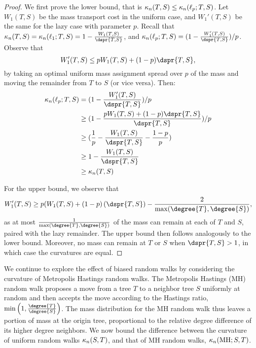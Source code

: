 \documentclass{amsart}
\newcommand{\curvature}[2][]{%
    \ifthenelse{\equal{#1}{}}%
		{\kappa_n(#2)}%
		{\kappa_n(#1;#2)}%
}
\begin{document}
\begin{proof}
	We first prove the lower bound, that is $\curvature{T,S} \le \curvature[\ell_p]{T,S}$.
	Let $W_1(T,S)$ be the mass transport cost in the uniform case, and $W_1'(T,S)$ be the same for the lazy case with parameter $p$.
	Recall that $\curvature{T,S} = \curvature[\ell_1]{T,S} = 1 - \frac{W_1(T,S)}{\dspr{T,S}}$, and $\curvature[\ell_p]{T,S} = (1 - \frac{W_1'(T,S)}{\dspr{T,S}}) / p$.
	Observe that $$W_1'(T,S) \le pW_1(T,S) + (1-p)\dspr{T,S},$$ by taking an optimal uniform mass assignment spread over $p$ of the mass and moving the remainder from $T$ to $S$ (or vice versa).
	Then:
	\begin{align*}
		\curvature[\ell_p]{T,S} &= (1 - \frac{W_1'(T,S)}{\dspr{T,S}}) / p \\
		&\ge (1 - \frac{pW_1(T,S) + (1-p)\dspr{T,S}}{\dspr{T,S}}) / p \\
		&\ge (\frac{1}{p} - \frac{W_1(T,S)}{\dspr{T,S}} - \frac{1-p}{p}) \\
		&\ge 1 - \frac{W_1(T,S)}{\dspr{T,S}} \\
		&\ge \curvature{T,S}
	\end{align*}

	For the upper bound, we observe that $$W_1'(T,S) \ge p(W_1(T,S) + (1-p)\left(\dspr{T,S}\right) - \frac{2}{\max(\degree{T}, \degree{S})},$$ as at most $\frac{1}{\max(\degree{T},\degree{S})}$ of the mass can remain at each of $T$ and $S$, paired with the lazy remainder.
	The upper bound then follows analogously to the lower bound.
	Moreover, no mass can remain at $T$ or $S$ when $\dspr{T,S} > 1$, in which case the curvatures are equal.
\end{proof}

We continue to explore the effect of biased random walks by considering the curvature of Metropolis Hastings random walks.
The Metropolis Hastings (MH) random walk proposes a move from a tree $T$ to a neighbor tree $S$ uniformly at random and then accepts the move according to the Hastings ratio, $\min\left(1, \frac{\degree{T}}{\degree{S}}\right)$.
The mass distribution for the MH random walk thus leaves a portion of mass at the origin tree, proportional to the relative degree difference of its higher degree neighbors.
We now bound the difference between the curvature of uniform random walks $\curvature{S,T}$, and that of MH random walks, $\curvature[\mathrm{MH}]{S,T}$.
\end{document}
